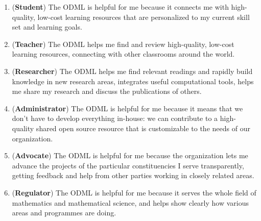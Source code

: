 \documentclass{article}
\begin{document}
\begin{enumerate}
\renewcommand{\theenumi}{\Roman{enumi}}
\item\label{student} (\textbf{Student})
The ODML is helpful for me because it connects me with high-quality, low-cost learning resources that are personalized to my current skill set and learning goals. 
\item\label{teacher} (\textbf{Teacher})
The ODML helps me find and review high-quality, low-cost learning resources, connecting with other classrooms around the world.
\item\label{researcher} (\textbf{Researcher})
The ODML helps me find relevant readings and rapidly build knowledge in new research areas, integrates useful computational tools, helps me share my research and discuss the publications of others.
\item\label{administrator} (\textbf{Administrator})
The ODML is helpful for me because it means that we don't have to develop everything in-house: we can contribute to a high-quality shared open source resource that is customizable to the needs of our organization.
\item\label{advocate} (\textbf{Advocate})
The ODML is helpful for me because the organization lets me advance the projects of the particular constituencies I serve transparently, getting feedback and help from other parties working in closely related areas.
\item\label{regulator} (\textbf{Regulator})
The ODML is helpful for me because it serves the whole field of mathematics and mathematical science, and helps show clearly how various areas and programmes are doing.
\end{enumerate}
\end{document}
